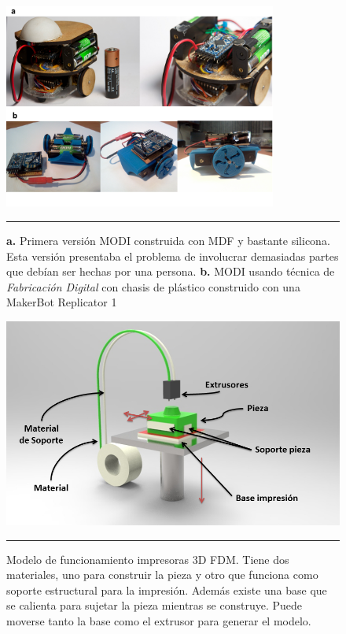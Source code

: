 \begin{figure}[htbp]
	\centering
		\includegraphics[width=0.8\textwidth]{./Pictures/modi_analogToDigital.png}
		\rule{35em}{0.5pt}
	\caption[Comparación de construcción análoga y digital]{\textbf{a.} Primera versión MODI construida con MDF y bastante silicona. Esta versión presentaba el problema de involucrar demasiadas partes que debían ser hechas por una persona. \textbf{b.} MODI usando técnica de \emph{ Fabricación Digital }con chasis de plástico construido con una MakerBot Replicator 1}
	\label{fig:analgTodigital}
\end{figure}

\begin{figure}[htbp]
	\centering
		\includegraphics[width=\textwidth]{./Figures/3Dprint.png}
		\rule{35em}{0.5pt}
	\caption[Modelo funcionamiento Impresora 3D]{Modelo de funcionamiento impresoras 3D FDM. Tiene dos materiales, uno para construir la pieza y otro que funciona como soporte estructural para la impresión. Además existe una base que se calienta para sujetar la pieza mientras se construye. Puede moverse tanto la base como el extrusor para generar el modelo.}
	\label{fig:3Dprint}
\end{figure}	



